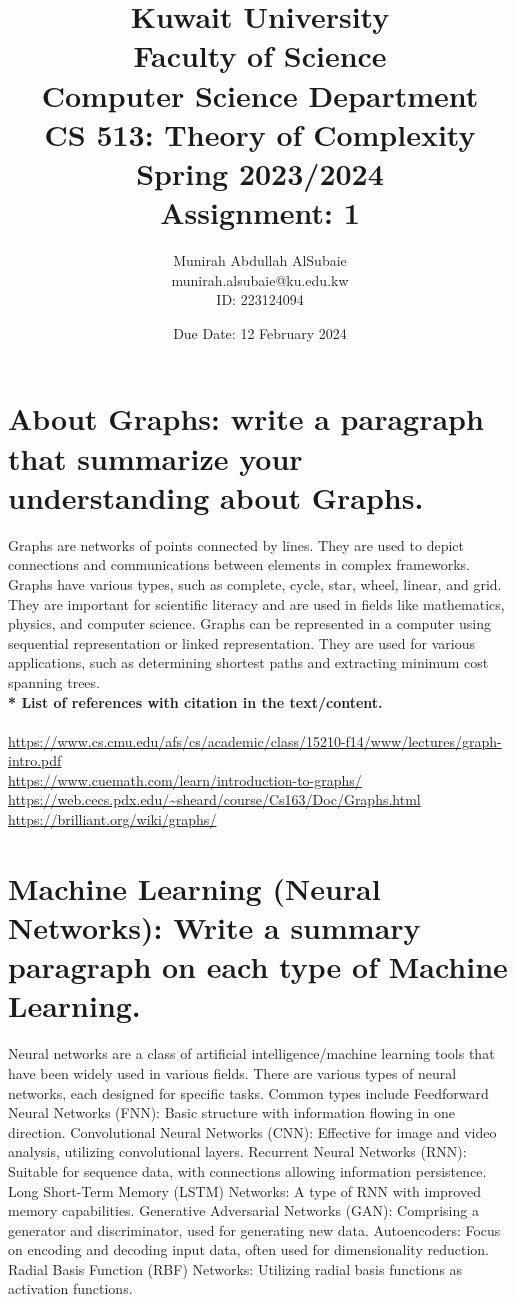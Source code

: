 \documentclass{article}
\title{Kuwait University\\
        Faculty of Science\\
        Computer Science Department\\
        CS 513: Theory of Complexity\\
        Spring 2023/2024\\
        Assignment: 1}
\date{Due Date: 12 February 2024}
\author{Munirah Abdullah AlSubaie \\
        munirah.alsubaie@ku.edu.kw\\
        ID: 223124094}
\begin{document}
\maketitle
\newpage

\section{About Graphs: write a paragraph that summarize your understanding about Graphs.}

Graphs are networks of points connected by lines. They are used to depict connections and communications between elements in complex frameworks. Graphs have various types, such as complete, cycle, star, wheel, linear, and grid. They are important for scientific literacy and are used in fields like mathematics, physics, and computer science. Graphs can be represented in a computer using sequential representation or linked representation. They are used for various applications, such as determining shortest paths and extracting minimum cost spanning trees.\\

\textbf{* List of references with citation in the text/content.}\\
\\
\url{https://www.cs.cmu.edu/afs/cs/academic/class/15210-f14/www/lectures/graph-intro.pdf}\\
\url{https://www.cuemath.com/learn/introduction-to-graphs/}\\
\url{https://web.cecs.pdx.edu/~sheard/course/Cs163/Doc/Graphs.html}\\
\url{https://brilliant.org/wiki/graphs/}\

\newpage

\section{Machine Learning (Neural Networks): Write a summary paragraph on each type of Machine Learning.}

Neural networks are a class of artificial intelligence/machine learning tools that have been widely used in various fields. There are various types of neural networks, each designed for specific tasks. Common types include Feedforward Neural Networks (FNN): Basic structure with information flowing in one direction. Convolutional Neural Networks (CNN): Effective for image and video analysis, utilizing convolutional layers. Recurrent Neural Networks (RNN): Suitable for sequence data, with connections allowing information persistence. Long Short-Term Memory (LSTM) Networks: A type of RNN with improved memory capabilities. Generative Adversarial Networks (GAN): Comprising a generator and discriminator, used for generating new data. Autoencoders: Focus on encoding and decoding input data, often used for dimensionality reduction. Radial Basis Function (RBF) Networks: Utilizing radial basis functions as activation functions.\\
\end{document}
